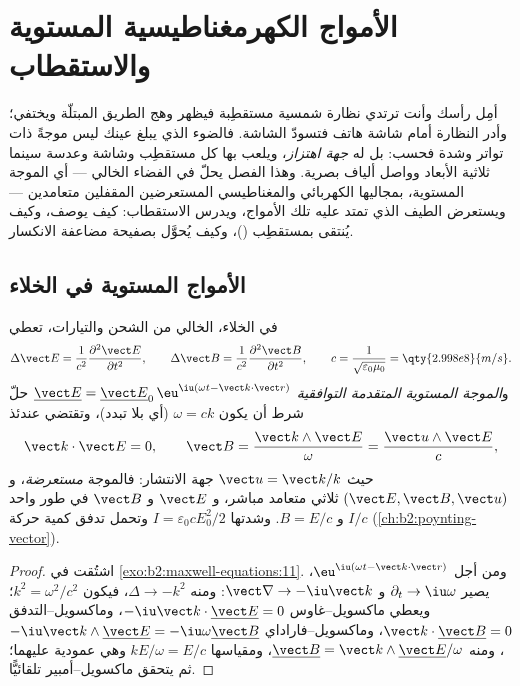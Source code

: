 \chapter{الأمواج الكهرمغناطيسية المستوية والاستقطاب}\label{ch:b2:plane-waves-polarization}

أمِل رأسك وأنت ترتدي نظارة شمسية مستقطِبة فيظهر وهج الطريق
المبتلّة ويختفي؛ وأدر النظارة أمام شاشة هاتف
فتسودّ الشاشة. فالضوء الذي يبلغ عينك ليس
موجةً ذات تواتر وشدة فحسب: بل له \emph{جهة
اهتزاز}، ويلعب بها كل مستقطِب وشاشة وعدسة سينما ثلاثية الأبعاد وواصل
ألياف بصرية. وهذا الفصل يحلّ 
في الفضاء الخالي --- أي الموجة المستوية، بمجاليها الكهربائي
والمغناطيسي المستعرضين المقفلين متعامدين --- ويستعرض الطيف الذي
تمتد عليه تلك الأمواج، ويدرس الاستقطاب: كيف يوصف، وكيف
يُنتقى بمستقطِب ()، وكيف يُحوَّل بصفيحة
مضاعفة الانكسار.

\section{الأمواج المستوية في الخلاء}

\begin{theorem}\label{thm:b2:plane-waves-polarization:wave}
في الخلاء، الخالي من الشحن والتيارات، تعطي 
\[
\Delta\vect E = \frac1{c^2}\frac{\partial^2\vect E}{\partial t^2} , \qquad
\Delta\vect B = \frac1{c^2}\frac{\partial^2\vect B}{\partial t^2} , \qquad
c = \frac1{\sqrt{\varepsilon_0\mu_0}} = \qty{2.998e8}{m/s} .
\]
و\emph{الموجة المستوية المتقدمة التوافقية} $\underline{\vect E} =
\underline{\vect E}_0\,\eu^{\iu(\omega t - \vect k\cdot\vect r)}$ حلّ شرط أن يكون
$\omega = ck$ (أي بلا تبدد)، وتقتضي  عندئذ
\[
\vect k\cdot\vect E = 0 , \qquad
\vect B = \frac{\vect k\wedge\vect E}\omega = \frac{\vect u\wedge\vect E}c ,
\]
حيث $\vect u = \vect k/k$ جهة الانتشار: فالموجة
\emph{مستعرضة}، و $(\vect E, \vect B, \vect u)$ ثلاثي متعامد
مباشر، و $\vect E$ و $\vect B$ في طور واحد و $B = E/c$. وشدتها
$I = \varepsilon_0cE_0^2/2$ وتحمل تدفق كمية حركة $I/c$
(\cref{ch:b2:poynting-vector}).
\end{theorem}

\begin{proof}
اشتُقت  في \cref{exo:b2:maxwell-equations:11}.
ومن أجل $\eu^{\iu(\omega t - \vect k\cdot\vect r)}$، يصير $\partial_t \to \iu\omega$ و $\vect\nabla \to
-\iu\vect k$: ومنه $\Delta \to -k^2$، فيكون $k^2 = \omega^2/c^2$؛ ويعطي ماكسويل--غاوس $-\iu
\vect k\cdot\underline{\vect E} = 0$، وماكسويل--التدفق $\vect k\cdot\underline{\vect B} = 0$،
وماكسويل--فاراداي $-\iu\vect k\wedge\underline{\vect E} = -\iu\omega\underline{\vect B}$، ومنه
$\underline{\vect B} = \vect k\wedge\underline{\vect E}/\omega$، ومقياسها $kE/\omega = E/c$ وهي
عمودية عليهما؛ ثم يتحقق ماكسويل--أمبير تلقائيًّا.
\end{proof}

